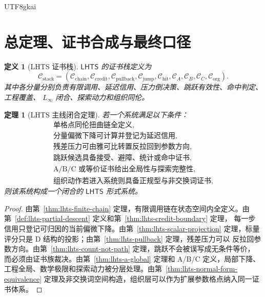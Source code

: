 \documentclass[12pt]{article}
\newtheorem{definition}{定义}[section]
\newtheorem{theorem}{定理}[section]
\newcommand{\LHTS}{\ensuremath{\mathsf{LHTS}}}
\newcommand{\Linfty}{\ensuremath{L_\infty}}
\begin{document}
\begin{CJK*}{UTF8}{gkai}
\section{总定理、证书合成与最终口径}
\label{sec:lhts-main-theorem}

\begin{definition}[LHTS 证书栈]
\label{def:lhts-cert-stack}
\LHTS{} 的证书栈定义为
\[
  \mathcal C_{\mathrm{stack}}
  =
  \left(
  \mathcal C_{\mathrm{chain}},
  \mathcal C_{\mathrm{credit}},
  \mathcal C_{\mathrm{pullback}},
  \mathcal C_{\mathrm{jump}},
  \mathcal C_{\mathrm{hit}},
  \mathcal C_A,
  \mathcal C_B,
  \mathcal C_C,
  \mathcal C_{\mathrm{org}}
  \right).
\]
其中各分量分别负责有限调用、延迟信用、压力倒决策、跳跃有效性、命中判定、工程覆盖、
\(\Linfty\) 闭合、探索动力和组织同伦。
\end{definition}

\begin{theorem}[LHTS 主线闭合定理]
\label{thm:lhts-main-closure}
若一个系统满足以下条件：
\[
\begin{gathered}
\text{单格点同伦扭曲链全定义},\\
\text{分量偏微下降可计算并登记为延迟信用},\\
\text{残差压力可由雅可比转置反拉回到参数方向},\\
\text{跳跃候选具备接受、避障、统计或命中证书},\\
\text{A/B/C 或等价证书给出全局性与探索完整性},\\
\text{组织动作若进入系统则具备正规型与非交换词证书},
\end{gathered}
\]
则该系统构成一个闭合的 \LHTS{} 形式系统。
\end{theorem}

\begin{proof}
由第~\ref{thm:lhts-finite-chain} 定理，有限调用链在状态空间内全定义。由
第~\ref{def:lhts-partial-descent} 定义和第~\ref{thm:lhts-credit-boundary} 定理，
每一步信用只登记可归因的当前偏微下降。由第~\ref{thm:lhts-scalar-projection}
定理，标量评分只是 D 结构的投影；由第~\ref{thm:lhts-pullback} 定理，残差压力可以
反拉回参数方向。由第~\ref{thm:lhts-count-not-path} 定理，跳跃不会被误写成无条件等价，
而必须由证书族裁决。由第~\ref{thm:lhts-a-global} 定理和 A/B/C 定义，局部下降、
工程全局、数学极限和探索动力被分层处理。由第~\ref{thm:lhts-normal-form-equivalence}
定理及非交换词空间构造，组织层可以作为扩展参数格点纳入同一证书体系。


\end{proof}
\end{CJK*}
\end{document}
